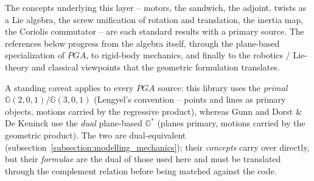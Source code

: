 The concepts underlying this layer -- motors, the sandwich, the adjoint, twists as a Lie
algebra, the screw unification of rotation and translation, the inertia map, the Coriolis
commutator -- are each standard results with a primary source. The references below
progress from the algebra itself, through the plane-based specialization of $PGA$, to
rigid-body mechanics, and finally to the robotics / Lie-theory and classical viewpoints
that the geometric formulation translates.

A standing caveat applies to every $PGA$ source: this library uses the \emph{primal}
$\mathbb{G}(2,0,1)$/$\mathbb{G}(3,0,1)$ (Lengyel's convention -- points and lines as
primary objects, motions carried by the regressive product), whereas Gunn and Dorst \& De
Keninck use the \emph{dual} plane-based $\mathbb{G}^*$ (planes primary, motions carried by
the geometric product). The two are dual-equivalent
(subsection~\ref{subsection:modelling_mechanics}); their \emph{concepts} carry over
directly, but their \emph{formulae} are the dual of those used here and must be translated
through the complement relation before being matched against the code.

